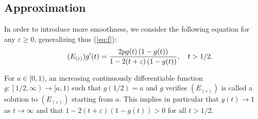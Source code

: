 \documentclass[a4, 11pt]{article}
\numberwithin{equation}{section}
\theoremstyle{plain}
\theoremstyle{definition}
\theoremstyle{remark}
\begin{document}
\subsection{Approximation}
\label{section:approximation}

In order to introduce more smoothness, we consider the following equation for any $\varepsilon \geq 0$, generalizing thus (\ref{eq:f}): 
\begin{equation}
\tag{$E_{(\varepsilon)}$}
\label{def:edo_approx}
	g'(t)=\frac{2pg(t)\left(1-g(t)\right)}{1-2(t+\varepsilon)\left(1-g(t)\right)}, \quad t>1/2.
\end{equation}


For $a\in [0,1)$, an increasing continuously differentiable function $g:\left[1/2,\infty\right)\to [a,1)$ such that $g\left(1/2\right)=a$ and $g$ verifies $(E_{(\varepsilon)})$ is called a solution to $(E_{(\varepsilon)})$ starting from $a$. This implies in particular that $g(t)\to 1$ as $t\to \infty$ and that $1-2(t+\varepsilon)(1-g(t))>0$ for all $t>1/2$.
\end{document}
